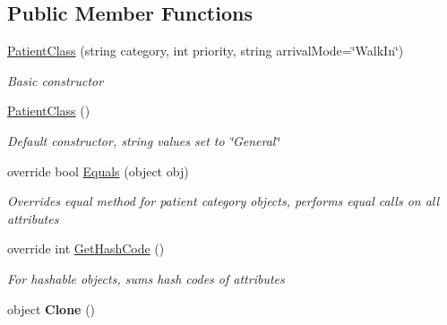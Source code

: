 \subsection*{Public Member Functions}
\begin{DoxyCompactItemize}
\item 
\hyperlink{class_general_health_care_elements_1_1_patient_class_aeea3e9e356db1458ab8b3e47389be442}{Patient\+Class} (string category, int priority, string arrival\+Mode=\char`\"{}Walk\+In\char`\"{})
\begin{DoxyCompactList}\small\item\em Basic constructor \end{DoxyCompactList}\item 
\hyperlink{class_general_health_care_elements_1_1_patient_class_a484eafa7aea2e43bacecda6b60c7e5c8}{Patient\+Class} ()
\begin{DoxyCompactList}\small\item\em Default constructor, string values set to \char`\"{}\+General\char`\"{} \end{DoxyCompactList}\item 
override bool \hyperlink{class_general_health_care_elements_1_1_patient_class_abe8f9346384035751700e5cd8e3469b3}{Equals} (object obj)
\begin{DoxyCompactList}\small\item\em Overrides equal method for patient category objects, performs equal calls on all attributes \end{DoxyCompactList}\item 
override int \hyperlink{class_general_health_care_elements_1_1_patient_class_abac4a1db2b5175ae32945a288e773369}{Get\+Hash\+Code} ()
\begin{DoxyCompactList}\small\item\em For hashable objects, sums hash codes of attributes \end{DoxyCompactList}\item 
object {\bfseries Clone} ()\hypertarget{class_general_health_care_elements_1_1_patient_class_a375465f0c224f20c21196610b5811c25}{}\label{class_general_health_care_elements_1_1_patient_class_a375465f0c224f20c21196610b5811c25}

\end{DoxyCompactItemize}
